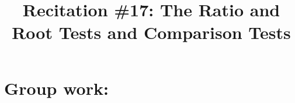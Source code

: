 \documentclass[handout]{ximera}
\title{Recitation \#17: The Ratio and Root Tests and Comparison Tests}
\begin{document}
\begin{abstract}		\end{abstract}
\maketitle












\section{Group work:}



%	
%	
%	
%	
%	
%		
%		
%		
%		
%		
%		
%		
%		
%		
%		
%		
\end{document}
